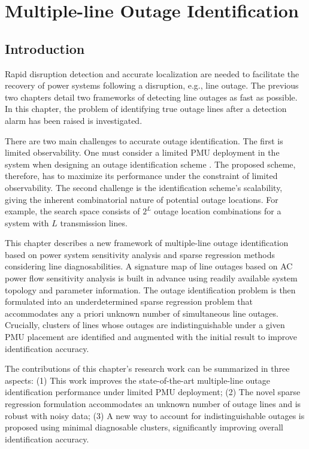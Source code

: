 
\chapter{Multiple-line Outage Identification}
\label{ch:identification}
\vspace{2em}

\section{Introduction} %
\label{ch5:sec:introduction}

Rapid disruption detection and accurate localization are needed to facilitate the recovery of power systems following a disruption, e.g., line outage. The previous two chapters detail two frameworks of detecting line outages as fast as possible. In this chapter, the problem of identifying true outage lines after a detection alarm has been raised is investigated.

There are two main challenges to accurate outage identification. The first is limited observability. One must consider a limited PMU deployment in the system when designing an outage identification scheme \cite{aminifar2014synchrophasor}. The proposed scheme, therefore, has to maximize its performance under the constraint of limited observability. The second challenge is the identification scheme's scalability, giving the inherent combinatorial nature of potential outage locations. For example, the search space consists of $2^L$ outage location combinations for a system with $L$ transmission lines.

This chapter describes a new framework of multiple-line outage identification based on power system sensitivity analysis and sparse regression methods considering line diagnosabilities. A signature map of line outages based on AC power flow sensitivity analysis is built in advance using readily available system topology and parameter information. The outage identification problem is then formulated into an underdetermined sparse regression problem that accommodates any a priori unknown number of simultaneous line outages. Crucially, clusters of lines whose outages are indistinguishable under a given PMU placement are identified and augmented with the initial result to improve identification accuracy.

The contributions of this chapter's research work can be summarized in three aspects: (1) This work improves the state-of-the-art multiple-line outage identification performance under limited PMU deployment; (2) The novel sparse regression formulation accommodates an unknown number of outage lines and is robust with noisy data; (3) A new way to account for indistinguishable outages is proposed using minimal diagnosable clusters, significantly improving overall identification accuracy.

